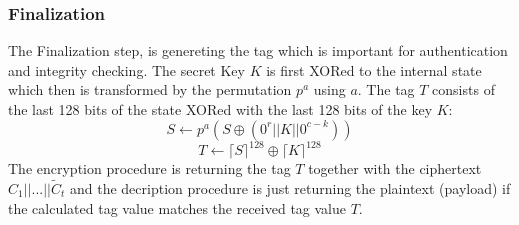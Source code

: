 \subsubsection{Finalization}
The Finalization step, is genereting the tag which is important for authentication and integrity checking.
The secret Key $K$ is first XORed to the internal state which then is transformed by the permutation $p^a$ using $a$. The tag $T$ consists of the last 128 bits of the state XORed with the last 128 bits of the key $K$: %
$$S \leftarrow p^a(S \oplus (0^r || K || 0^{c-k}))$$
$$ T \leftarrow \lceil S  \rceil^{128} \oplus \lceil K \rceil^{128}$$
The encryption procedure is returning the tag $T$ together with the ciphertext $C_1||...||\tilde C_t$ and the decription procedure is just returning the plaintext (payload) if the calculated tag value matches the received tag value $T$. \cite{Ascon-v1.2}
